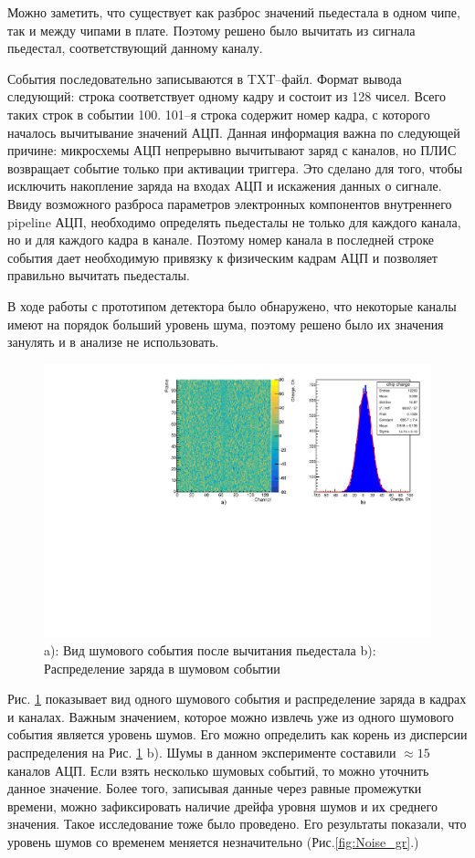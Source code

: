 Можно заметить, что существует как разброс значений пьедестала в одном чипе, так и между чипами в плате. Поэтому решено было вычитать из сигнала пьедестал, соответствующий данному каналу.
\par События последовательно записываются в TXT--файл. Формат вывода следующий: строка соответствует одному кадру и состоит из 128 чисел. Всего таких строк в событии 100. 101--я строка содержит номер кадра, с которого началось вычитывание значений АЦП. Данная информация важна по следующей причине: микросхемы АЦП непрерывно вычитывают заряд с каналов, но ПЛИС возвращает событие только при активации триггера. Это сделано для того, чтобы исключить накопление заряда на входах АЦП и искажения данных о сигнале. Ввиду возможного разброса параметров электронных компонентов внутреннего pipeline АЦП, необходимо определять пьедесталы не только для каждого канала, но и для каждого кадра в канале. Поэтому номер канала в последней строке события дает необходимую привязку к физическим кадрам АЦП и позволяет правильно вычитать пьедесталы.
\par В ходе работы с прототипом детектора было обнаружено, что некоторые каналы имеют на порядок больший уровень шума, поэтому решено было их значения занулять и в анализе не использовать. 
\begin{figure}[H]
	\begin{center}
		\includegraphics[width = 12cm]{img/noise_map.pdf}
		\caption{a): Вид шумового события после вычитания пьедестала b): Распределение заряда в шумовом событии}
		\label{noise_map}
	\end{center}
\end{figure}
Рис. \ref{noise_map} показывает вид одного шумового события и распределение заряда в кадрах и каналах. Важным значением, которое можно извлечь уже из одного шумового события является уровень шумов. Его можно определить как корень из дисперсии распределения на Рис. \ref{noise_map} b). Шумы в данном эксперименте составили $\approx15$ каналов АЦП. Если взять несколько шумовых событий, то можно уточнить данное значение. Более того, записывая данные через равные промежутки времени, можно зафиксировать наличие дрейфа уровня шумов и их среднего значения. Такое исследование тоже было проведено. Его результаты показали, что уровень шумов со временем меняется незначительно (Рис.\ref{fig:Noise_gr}.)


